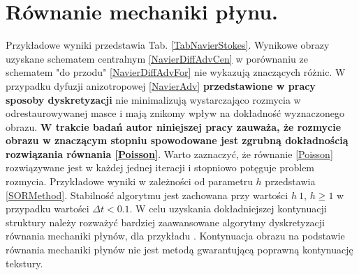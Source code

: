 \documentclass[12pt, twoside, openany]{report}
\theoremstyle{definition}
\begin{document}
\section{Równanie mechaniki płynu.}
\label{sec:NVResult}
Przykładowe wyniki  przedstawia Tab. \ref{TabNavierStokes}. Wynikowe obrazy uzyskane schematem centralnym \eqref{NavierDiffAdvCen} w porównaniu ze schematem "do przodu" \eqref{NavierDiffAdvFor} nie wykazują znaczących różnic. W przypadku dyfuzji anizotropowej \eqref{NavierAdv}  \textbf{przedstawione w pracy sposoby dyskretyzacji} nie minimalizują wystarczająco rozmycia w odrestaurowywanej masce i mają znikomy wpływ na dokładność wyznaczonego obrazu. \textbf{W trakcie badań autor niniejszej pracy zauważa, że rozmycie obrazu w znaczącym stopniu spowodowane jest zgrubną dokładnością rozwiązania równania \eqref{Poisson}}. Warto zaznaczyć, że równanie \eqref{Poisson} rozwiązywane jest w każdej jednej iteracji i stopniowo potęguje problem rozmycia. Przykładowe wyniki w zależności od parametru $h$  przedstawia \autoref{SORMethod}. Stabilność algorytmu jest zachowana przy wartości $h~1$, $h \geq1$ w przypadku wartości $\Delta t <0.1$. W celu uzyskania dokładniejszej kontynuacji struktury należy rozważyć bardziej zaawansowane algorytmy dyskretyzacji równania mechaniki płynów, dla przykładu \cite{tschumperle2006fast}. Kontynuacja obrazu na podstawie równania mechaniki płynów nie jest metodą gwarantującą poprawną kontynuację tekstury.
\end{document}
